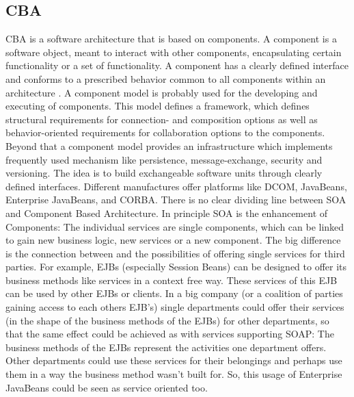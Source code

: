 \documentclass[12pt,a4paper,final,twoside,onecolumn,titlepage]{book}
\begin{document}
\subsection{CBA}
\gls{CBA} is a software architecture that is based on components. A component is a software object, meant to interact with other components, encapsulating certain functionality or a set of functionality. A component has a clearly defined interface and conforms to a prescribed behavior common to all components within an architecture \cite{SOAvsCBA}. A component model is probably used for the developing and executing of components. This model defines a framework, which defines structural requirements for connection- and composition options as well as behavior-oriented requirements for collaboration options to the components. Beyond that a component model provides an infrastructure which implements frequently used mechanism like persistence, message-exchange, security  and versioning. The idea is to build exchangeable software units through  clearly defined interfaces. Different manufactures offer platforms like DCOM, JavaBeans, Enterprise JavaBeans, and CORBA. 
There is no clear dividing line between \gls{SOA} and Component Based Architecture. In principle \gls{SOA} is the enhancement of Components: The individual services are single components, which can be linked to gain new business logic, new services or a new component. The big difference is the connection between and the possibilities of offering single services for third parties. For example, EJBs (especially Session Beans) can be designed to offer its business methods like services in a context free way. These services of this EJB can be used by other EJBs or clients. In a big company (or a coalition of parties gaining access to each others EJB’s) single departments could offer their services (in the shape of the business methods of the EJBs) for other departments, so that the same effect could be achieved as with services supporting \gls{SOAP}: The business methods of the EJBs 
represent the activities one department offers. Other departments could use these services for their belongings and perhaps use them in a way the business method wasn't built for. So, this usage of Enterprise JavaBeans could be seen as service oriented too. 
\end{document}
